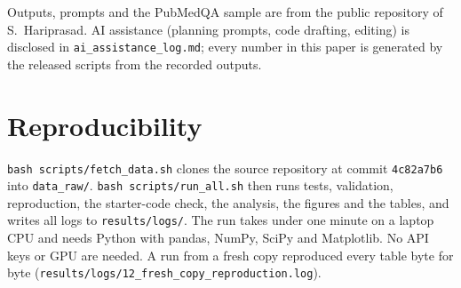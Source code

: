 \documentclass[acmsmall]{acmart}
\begin{document}
\begin{acks}
Outputs, prompts and the PubMedQA sample are from the public repository of S.~Hariprasad. AI assistance (planning prompts, code drafting, editing) is disclosed in \texttt{ai\_assistance\_log.md}; every number in this paper is generated by the released scripts from the recorded outputs.
\end{acks}




\appendix
\section{Reproducibility}
\texttt{bash scripts/fetch\_data.sh} clones the source repository at commit \texttt{4c82a7b6} into \texttt{data\_raw/}. \texttt{bash scripts/run\_all.sh} then runs tests, validation, reproduction, the starter-code check, the analysis, the figures and the tables, and writes all logs to \texttt{results/logs/}. The run takes under one minute on a laptop CPU and needs Python with pandas, NumPy, SciPy and Matplotlib. No API keys or GPU are needed. A run from a fresh copy reproduced every table byte for byte (\texttt{results/logs/12\_fresh\_copy\_reproduction.log}).
\end{document}
